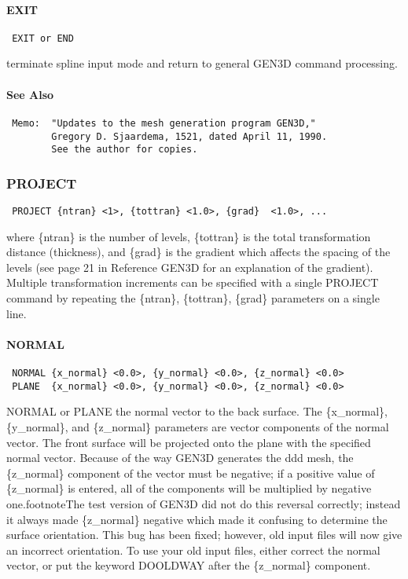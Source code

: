 \paragraph{EXIT}
\begin{verbatim}
 EXIT or END
\end{verbatim}

terminate spline input mode and return to general GEN3D command
processing.
\paragraph{See Also}
\begin{verbatim}
 Memo:  "Updates to the mesh generation program GEN3D,"
        Gregory D. Sjaardema, 1521, dated April 11, 1990.
        See the author for copies.
\end{verbatim}
\subsubsection{PROJECT}
\begin{verbatim}
 PROJECT {ntran} <1>, {tottran} <1.0>, {grad}  <1.0>, ...
\end{verbatim}

where \{ntran\} is the number of levels, \{tottran\} is the total
transformation distance (thickness), and \{grad\} is the gradient which
affects the spacing of the levels (see page 21 in Reference GEN3D
for an explanation of the gradient).  Multiple transformation increments
can be specified with a single PROJECT command by repeating the \{ntran\},
\{tottran\}, \{grad\} parameters on a single line.
\paragraph{NORMAL}
\begin{verbatim}
 NORMAL {x_normal} <0.0>, {y_normal} <0.0>, {z_normal} <0.0>
 PLANE  {x_normal} <0.0>, {y_normal} <0.0>, {z_normal} <0.0>
\end{verbatim}

NORMAL or PLANE  the normal vector to the back surface.  The
\{x\_normal\}, \{y\_normal\}, and \{z\_normal\} parameters are vector components
of the normal vector.  The front surface will be projected onto the
plane with the specified normal vector.  Because of the way GEN3D
generates the ddd mesh, the \{z\_normal\} component of the vector must be
negative; if a positive value of \{z\_normal\} is entered, all of the
components will be multiplied by negative one.footnoteThe test version
of GEN3D did not do this reversal correctly; instead it always made
\{z\_normal\} negative which made it confusing to determine the surface
orientation.  This bug has been fixed; however, old input files will now
give an incorrect orientation.  To use your old input files, either
correct the normal vector, or put the keyword DOOLDWAY after the
\{z\_normal\} component.

